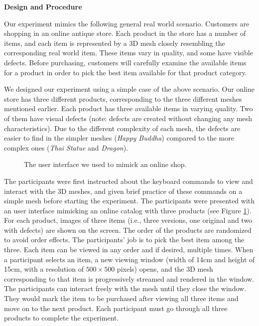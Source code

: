\textbf{Design and Procedure}

Our experiment mimics the following general real world scenario. Customers
are shopping in an online antique store. Each product in the store has a
number of items, and each item is represented by a 3D mesh closely resembling
the corresponding real world item. These items vary in quality, and some
have visible defects. Before purchasing, customers will carefully examine the
available items for a product in order to pick the best item available for
that product category.

We designed our experiment using a simple case of the above scenario. 
Our online store has three different products,
corresponding to the three different meshes mentioned earlier. Each product
has three available items in varying quality. Two of them have visual
defects (note: defects are created without changing any mesh
characteristics). Due to the different complexity of each mesh, the defects
are easier to find in the simpler meshes (\textit{Happy Buddha}) compared to the more
complex ones (\textit{Thai Statue} and \textit{Dragon}).

\begin{figure}
    \centering
    \caption{The user interface we used to mimick an online shop.}
    \label{f:user:shop}
\end{figure}
The participants were first instructed about the keyboard commands 
to view and interact with the 3D meshes, and given brief practice of
these commands on a simple mesh before starting the experiment. The
participants were presented with an user interface mimicking an online
catalog with three products (see Figure \ref{f:user:shop}).  For each product, images of three items 
(i.e., three versions, one original and two with defects) are shown on the screen.
The order of the products are randomized to avoid order effects.
The participants' job is to pick the best item among the three. Each item 
can be viewed in any order and if desired, multiple times.  When 
a participant selects an item, a new viewing window (width of 14cm and
height of 15cm, with a resolution of $500 \times 500$ pixels) opens, and the 3D mesh corresponding to that item is
progressively streamed and rendered in the window.  
The participants can interact freely
with the mesh until they close the window.
They would mark the item to be purchased after viewing all three items and
move on to the next product. Each participant must go through all three products to
complete the experiment.

